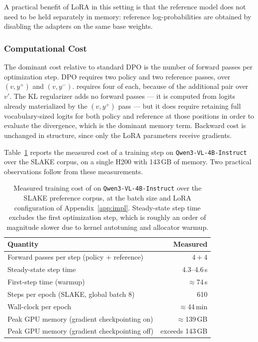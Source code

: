 A practical benefit of LoRA in this setting is that the reference model does not need to be held separately in memory: reference log-probabilities are obtained by disabling the adapters on the same base weights.

\subsubsection{Computational Cost}

The dominant cost relative to standard DPO is the number of forward passes per optimization step. DPO requires two policy and two reference passes, over $(v, y^+)$ and $(v, y^-)$. \ourloss{} requires four of each, because of the additional pair over $v'$. The KL regularizer adds no forward passes --- it is computed from logits already materialized by the $(v, y^+)$ pass --- but it does require retaining full vocabulary-sized logits for both policy and reference at those positions in order to evaluate the divergence, which is the dominant memory term. Backward cost is unchanged in structure, since only the LoRA parameters receive gradients.

Table~\ref{tab:cost} reports the measured cost of a \ourloss{} training step on \texttt{Qwen3-VL-4B-Instruct} over the SLAKE corpus, on a single H200 with 143\,GB of memory. Two practical observations follow from these measurements.

\begin{table}[ht]
\centering
\small
\caption{Measured training cost of \ourloss{} on \texttt{Qwen3-VL-4B-Instruct} over the SLAKE preference corpus, at the batch size and LoRA configuration of Appendix~\ref{app:impl}. Steady-state step time excludes the first optimization step, which is roughly an order of magnitude slower due to kernel autotuning and allocator warmup.}
\label{tab:cost}
\begin{tabular}{lr}
\toprule
\textbf{Quantity} & \textbf{Measured} \\
\midrule
Forward passes per step (policy + reference) & $4 + 4$ \\
Steady-state step time & 4.3--4.6\,s \\
First-step time (warmup) & $\approx$74\,s \\
Steps per epoch (SLAKE, global batch 8) & 610 \\
Wall-clock per epoch & $\approx$44\,min \\
Peak GPU memory (gradient checkpointing on) & $\approx$139\,GB \\
Peak GPU memory (gradient checkpointing off) & exceeds 143\,GB \\
\bottomrule
\end{tabular}
\end{table}

